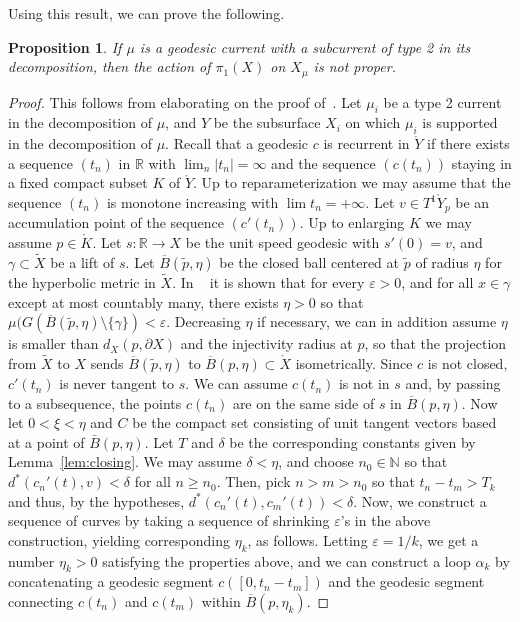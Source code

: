 \documentclass[12pt,article]{amsart}
\numberwithin{equation}{section}
\numberwithin{figure}{section}
\newtheorem{proposition}[equation]{Proposition}
\theoremstyle{definition}
\theoremstyle{plain}
\newcommand*{\wt}[1]{\widetilde{#1}}
\renewcommand{\epsilon}{\varepsilon}
\begin{document}
Using this result, we can prove the following.

\begin{proposition}
If $\mu$ is a geodesic current with a subcurrent of type 2 in its decomposition, then the action of $\pi_1(X)$ on $X_{\mu}$ is not proper.
\label{prop:fillingmeasnotprop}
\end{proposition}
\begin{proof}
This follows from elaborating on the proof of~\cite[Proposition~5.1]{BIPP21:Currents}.
Let $\mu_i$ be a type 2 current in the decomposition of $\mu$, and $Y$ be the subsurface $X_i$ on which $\mu_i$ is supported in the decomposition of $\mu$.
Recall that a geodesic $c$ is recurrent in $\mathring{Y}$ if there exists a sequence
$(t_n)$ in $\mathbb{R}$ with $\lim_n |t_n| = \infty$ and the sequence $( c(t_n) )$ staying in a fixed compact subset $K$ of $\mathring{Y}$. Up to reparameterization
we may assume that the sequence $(t_n)$ is monotone increasing with
$\lim t_n = +\infty$. Let $v \in T^1 \mathring{Y}_p$ be an accumulation point of the sequence
$(c'(t_n))$. Up to enlarging $K$ we may assume $p \in \mathring{K}$. Let $s \colon \mathbb{R} \to X$ be the unit speed geodesic with $s'(0) = v$, and $\gamma \subset \wt{X}$ be a lift of $s$.
Let $\overline{B}(\wt{p},\eta)$ be the closed ball centered at $\wt{p}$ of radius $\eta$ for the hyperbolic metric in $\wt{X}$.
In ~\cite[Proposition~5.1]{BIPP21:Currents} it is shown that for every $\epsilon>0$, and for all $x \in \gamma$ except at most countably many, there exists $\eta>0$ so that $\mu(G(\overline{B}(\wt{p},\eta) \setminus \{ \gamma \})< \epsilon$.
Decreasing $\eta$ if necessary, we can in addition assume $\eta$ is smaller than $d_{X}(p, \partial X)$ and the injectivity radius at $p$, so that the projection from $\wt{X}$ to $X$ sends $\overline{B}(\wt{p},\eta)$ to $\overline{B}(p,\eta) \subset \mathring{X}$
isometrically. Since $c$ is not closed, $c'(t_n)$ is never tangent to $s$. We can assume $c(t_n)$ is not in $s$ and, by passing to a subsequence, the points $c(t_n)$ are on the same side of $s$ in $\overline{B}(p, \eta)$.
Now let $0 < \xi < \eta$ and $C$ be the compact set consisting of unit tangent vectors based at a point of $\bar{B}(p,\eta)$. Let $T$ and $\delta$ be the corresponding
constants given by Lemma~\ref{lem:closing}. We may assume $\delta < \eta$, and choose $n_0 \in \mathbb{N}$ so that $d^*(c_n'(t), v)< \delta$ for all $n \geq n_0$. Then, pick $n>m>n_0$ so that $t_n - t_m > T_k$ and thus, by the hypotheses, $d^*(c_n'(t), c_m'(t))< \delta$.
Now, we construct a sequence of curves by taking a sequence of shrinking $\epsilon$'s in the above construction, yielding corresponding $\eta_k$, as follows. Letting $\epsilon=1/k$, we get a number $\eta_k>0$ satisfying the properties above, and we can construct a loop $\alpha_k$ by concatenating a geodesic segment $c([0, t_n - t_m])$ and the geodesic segment connecting $c(t_n)$ and $c(t_m)$ within $\overline{B}(p,\eta_k)$.

\end{proof}
\end{document}
